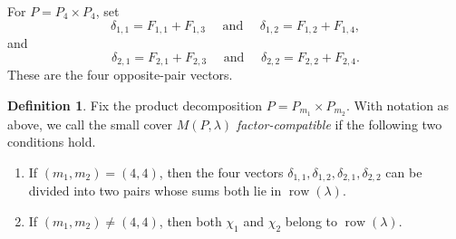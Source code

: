 \documentclass{amsart}
\numberwithin{equation}{section}
\theoremstyle{definition}
\newtheorem{definition}[theorem]{Definition}
\theoremstyle{remark}
\DeclareMathOperator{\row}{row}
\begin{document}
For $P=P_4\times P_4$, set
$$
    \delta_{1,1}=F_{1,1}+F_{1,3} \quad \text{ and } \quad \delta_{1,2}=F_{1,2}+F_{1,4},
$$
and
$$
    \delta_{2,1}=F_{2,1}+F_{2,3} \quad \text{ and } \quad \delta_{2,2}=F_{2,2}+F_{2,4}.
$$
These are the four opposite-pair vectors.


\begin{definition}
    Fix the product decomposition $P=P_{m_1}\times P_{m_2}$.
    With notation as above, we call the small cover $M(P,\lambda)$ \emph{factor-compatible} if the following two conditions hold.
    \begin{enumerate}
        \item If $(m_1,m_2)=(4,4)$, then the four vectors $\delta_{1,1},\delta_{1,2},\delta_{2,1},\delta_{2,2}$ can be divided into two pairs whose sums both lie in $\row(\lambda)$.
        \item If $(m_1,m_2)\neq(4,4)$, then both $\chi_1$ and $\chi_2$ belong to $\row(\lambda)$.
    \end{enumerate}
\end{definition}
\end{document}
